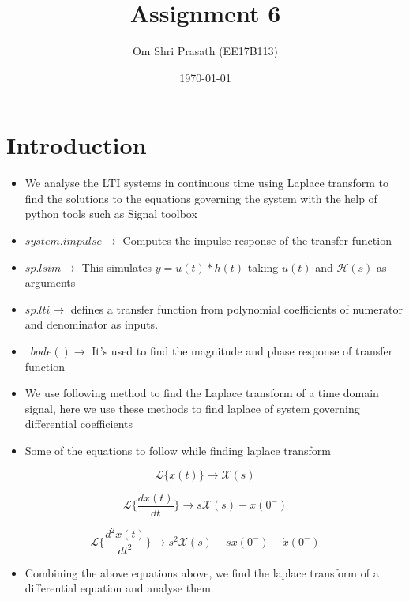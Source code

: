 \documentclass[11pt, a4paper]{article}
\title{Assignment 6} %
\author{Om Shri Prasath (EE17B113)} %
\date{\today} %
\begin{document}
	

\maketitle %
\section{Introduction}\label{introduction}

\begin{itemize}
\item
  We analyse the LTI systems in continuous time using Laplace
  transform to find the solutions to the equations governing the system
  with the help of python tools such as Signal toolbox\\
\item
  \(system.impulse \to\) Computes the impulse response of the transfer
  function
\item
  \(sp.lsim \to\) This simulates \(y=u(t)*h(t)\) taking \(u(t)\) and  $\mathcal{H}(s)$ as arguments
\item
  \(sp.lti \to\) defines a transfer function from polynomial
  coefficients of numerator and denominator as inputs.
\item
  \ $bode() \to $ It's used to find the magnitude and phase response of
  transfer function
\item
  We use following method to find the Laplace transform of a time domain
  signal, here we use these methods to find laplace of system governing
  differential coefficients
\item
  Some of the equations to follow while finding laplace transform
\end{itemize}

\begin{equation}
    \mathscr{L}\{x(t)\} \to \mathcal{X}(s)
\end{equation}

\begin{equation}
    \mathscr{L}\{\frac{dx(t)}{dt}\} \to s\mathcal{X}(s)-x(0^{-})
\end{equation}

\begin{equation}
    \mathscr{L}\{\frac{d^{2}x(t)}{dt^{2}}\} \to s^{2}\mathcal{X}(s)-sx(0^{-})-\dot x(0^{-})
\end{equation}

\begin{itemize}
\item
  Combining the above equations above, we find the laplace transform of
  a differential equation and analyse them.
\end{itemize}
\end{document}

